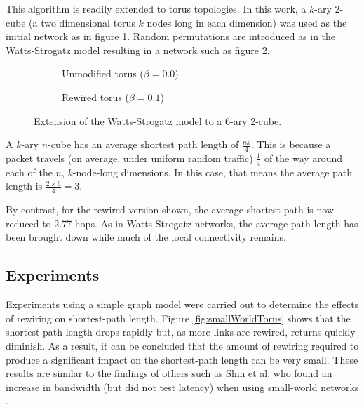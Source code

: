 			This algorithm is readily extended to torus topologies. In this work, a
			$k$-ary 2-cube (a two dimensional torus $k$ nodes long in each dimension)
			was used as the initial network as in figure \ref{fig:torusNetworkB0}.
			Random permutations are introduced as in the Watts-Strogatz model
			resulting in a network such as figure \ref{fig:torusNetworkB01}.
			
			\begin{figure}
				\center
				\begin{subfigure}[t]{0.45\textwidth}
					\center
					
					\caption{Unmodified torus ($\beta=0.0$)}
					\label{fig:torusNetworkB0}
				\end{subfigure}
				\begin{subfigure}[t]{0.45\textwidth}
					\center
					
					\caption{Rewired torus ($\beta=0.1$)}
					\label{fig:torusNetworkB01}
				\end{subfigure}
				
				\caption{Extension of the Watts-Strogatz model to a 6-ary 2-cube.}
				\label{fig:torusNetwork}
			\end{figure}
			
			A $k$-ary $n$-cube has an average shortest path length of $\frac{nk}{4}$.
			This is because a packet travels (on average, under uniform random
			traffic) $\frac{1}{4}$ of the way around each of the $n$, $k$-node-long
			dimensions. In this case, that means the average path length is $\frac{2
			\times 6}{4} = 3$.
			
			By contrast, for the rewired version shown, the average shortest path is
			now reduced to 2.77 hops. As in Watts-Strogatz networks, the average path
			length has been brought down while much of the local connectivity remains.
		
		
		\subsection{Experiments}
			
			Experiments using a simple graph model were carried out to determine the
			effects of rewiring on shortest-path length. Figure
			\ref{fig:smallWorldTorus} shows that the shortest-path length drops
			rapidly but, as more links are rewired, returns quickly diminish. As a
			result, it can be concluded that the amount of rewiring required to
			produce a significant impact on the shortest-path length can be very
			small. These results are similar to the findings of others such as Shin et
			al. who found an increase in bandwidth (but did not test latency) when
			using small-world networks \cite{shin11}.
			
